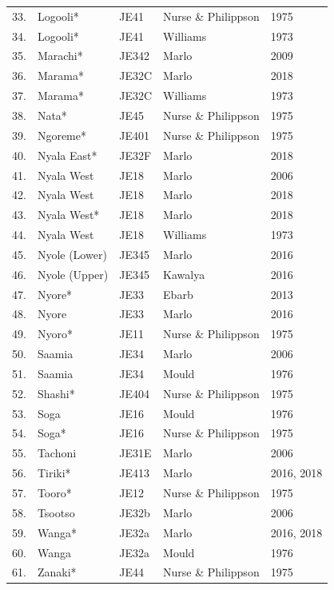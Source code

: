 \documentclass[output=paper]{langscibook}
\begin{document}
\begin{longtable}{lllll}
33. & Logooli* & JE41 & Nurse \& Philippson & 1975 \\
34. & Logooli* & JE41 & Williams & 1973 \\
35. & Marachi* & JE342 & Marlo & 2009 \\
36. & Marama* & JE32C & Marlo & 2018 \\
37. & Marama* & JE32C & Williams & 1973 \\
38. & Nata* & JE45 & Nurse \& Philippson & 1975 \\
39. & Ngoreme* & JE401 & Nurse \& Philippson & 1975 \\
40. & Nyala East* & JE32F & Marlo & 2018 \\
41. & Nyala West & JE18 & Marlo & 2006 \\
42. & Nyala West & JE18 & Marlo & 2018 \\
43. & Nyala West* & JE18 & Marlo & 2018 \\
44. & Nyala West & JE18 & Williams & 1973 \\
45. & Nyole (Lower) & JE345 & Marlo & 2016 \\
46. & Nyole (Upper) & JE345 & Kawalya & 2016 \\
47. & Nyore* & JE33 & Ebarb & 2013 \\
48. & Nyore & JE33 & Marlo & 2016 \\
49. & Nyoro* & JE11 & Nurse \& Philippson & 1975 \\
50. & Saamia & JE34 & Marlo & 2006 \\
51. & Saamia & JE34 & Mould & 1976 \\
52. & Shashi* & JE404 & Nurse \& Philippson & 1975 \\
53. & Soga & JE16 & Mould & 1976 \\
54. & Soga* & JE16 & Nurse \& Philippson & 1975 \\
55. & Tachoni & JE31E & Marlo & 2006 \\
56. & Tiriki* & JE413 & Marlo & 2016, 2018 \\
57. & Tooro* & JE12 & Nurse \& Philippson & 1975 \\
58. & Tsootso & JE32b & Marlo & 2006 \\
59. & Wanga* & JE32a & Marlo & 2016, 2018 \\
60. & Wanga & JE32a & Mould & 1976 \\
61. & Zanaki* & JE44 & Nurse \& Philippson & 1975 \\
\end{longtable}
\end{document}
